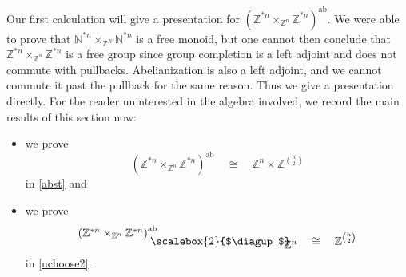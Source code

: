 \documentclass{amsbook} %
\newcommand{\bigquotient}[2]{ \raisebox{0.75\height}{$#1$} \mkern-12mu\scalebox{2}{$\diagup$}\mkern-10mu \raisebox{-0.5\height}{$#2$} }
\numberwithin{section}{chapter}
\begin{document}
 Our first calculation will give a presentation for $(\mathbb{Z}^{\ast n} \times_{\mathbb{Z}^n} \mathbb{Z}^{\ast n})^{\mathrm{ab}}$. We were able to prove that $\mathbb{N}^{\ast n} \times_{\mathbb{Z}^N} \mathbb{N}^{\ast n}$ is a free monoid, but one cannot then conclude that $\mathbb{Z}^{\ast n} \times_{\mathbb{Z}^n} \mathbb{Z}^{\ast n}$ is a free group since group completion is a left adjoint and does not commute with pullbacks. Abelianization is also a left adjoint, and we cannot commute it past the pullback for the same reason. Thus we give a presentation directly. For the reader uninterested in the algebra involved, we record the main results of this section now:
 \begin{itemize}
 \item we prove
 \[ (\mathbb{Z}^{\ast n} \times_{\mathbb{Z}^n} \mathbb{Z}^{\ast n})^{\mathrm{ab}} \quad \cong \quad \mathbb{Z}^n \times {\mathbb{Z}}^{{n}\choose{2}} \]
 in \cref{abst} and
 \item we prove
 \[ 
			 \bigquotient{{(\mathbb{Z}^{\ast n} \times_{\mathbb{Z}^n} \mathbb{Z}^{\ast n})}^{\mathrm{ab}}}{\mathbb{Z}^n}  \quad \cong\quad \mathbb{Z}^{{n}\choose{2}} 
\]
in \cref{nchoose2}.
 \end{itemize}
\end{document}
